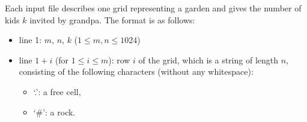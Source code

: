 Each input file describes one grid representing a garden and gives the number of kids $k$ invited by grandpa. The format is as follows:
\begin{itemize}
\item line 1: $m$, $n$, $k$ ($1 \leq m, n \leq 1024$)
\item line $1 + i$ (for $1 \le i \le m$): row $i$ of the grid, which is a string of length $n$, consisting of the following characters (without any whitespace):
\begin{itemize}
\item `.': a free cell,
\item `\#': a rock.
\end{itemize}
\end{itemize}